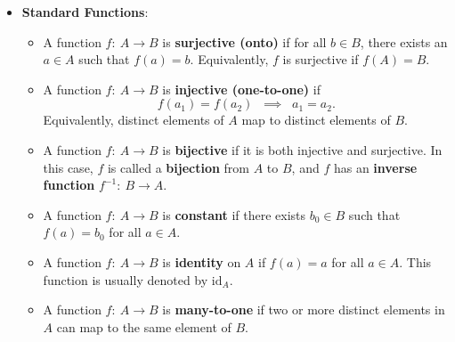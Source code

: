 \documentclass{report}
\begin{document}
    \pagebreak 
    \begin{itemize}
        \item \textbf{Standard Functions}:
            \begin{itemize}
                \item A function $f:\ A \to B$ is \textbf{surjective (onto)} if for all $b \in B$, there exists an $a \in A$ such that $f(a) = b$.  
                    Equivalently, $f$ is surjective if $f(A) = B$.

                \item A function $f:\ A \to B$ is \textbf{injective (one-to-one)} if 
                    \[
                        f(a_{1}) = f(a_{2}) \;\; \implies \;\; a_{1} = a_{2}.
                    \]
                    Equivalently, distinct elements of $A$ map to distinct elements of $B$.

                \item A function $f:\ A \to B$ is \textbf{bijective} if it is both injective and surjective.  
                    In this case, $f$ is called a \textbf{bijection} from $A$ to $B$, and $f$ has an \textbf{inverse function} $f^{-1}:\ B \to A$.

                \item A function $f:\ A \to B$ is \textbf{constant} if there exists $b_{0} \in B$ such that $f(a) = b_{0}$ for all $a \in A$.

                \item A function $f:\ A \to B$ is \textbf{identity} on $A$ if $f(a) = a$ for all $a \in A$.  
                    This function is usually denoted by $\mathrm{id}_{A}$.

                \item A function $f:\ A \to B$ is \textbf{many-to-one} if two or more distinct elements in $A$ can map to the same element of $B$.


\end{itemize}
\end{itemize}
\end{document}

